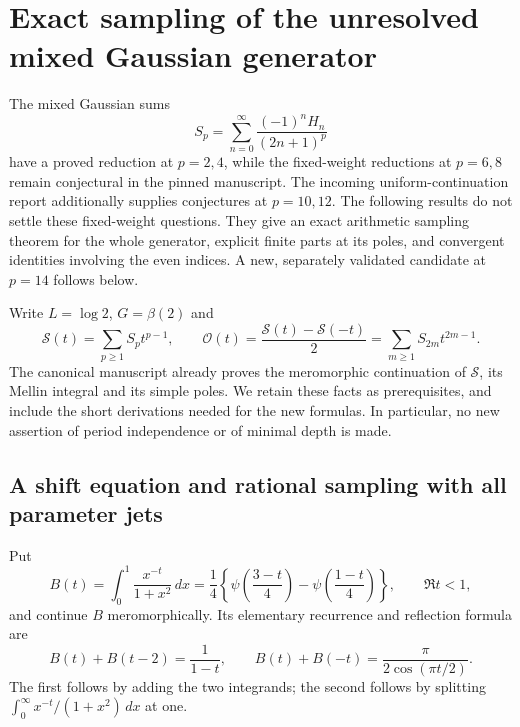 \section{Exact sampling of the unresolved mixed Gaussian generator}
\label{mix:sec}

The mixed Gaussian sums
\[
 S_p=\sum_{n=0}^{\infty}\frac{(-1)^nH_n}{(2n+1)^p}
\]
have a proved reduction at $p=2,4$, while the fixed-weight reductions at
$p=6,8$ remain conjectural in the pinned manuscript.  The incoming
uniform-continuation report additionally supplies conjectures at $p=10,12$.
The following results do not settle these fixed-weight questions. They give
an exact arithmetic sampling theorem for the whole generator, explicit
finite parts at its poles, and convergent identities involving the even
indices. A new, separately validated candidate at $p=14$ follows below.

Write $L=\log2$, $G=\beta(2)$ and
\[
 \mathcal S(t)=\sum_{p\ge1}S_pt^{p-1},\qquad
 \mathcal O(t)=\frac{\mathcal S(t)-\mathcal S(-t)}2
             =\sum_{m\ge1}S_{2m}t^{2m-1}.
\]
The canonical manuscript already proves the meromorphic continuation of
$\mathcal S$, its Mellin integral and its simple poles. We retain these
facts as prerequisites, and include the short derivations needed for the
new formulas. In particular, no new assertion of period independence or
of minimal depth is made.

\subsection{A shift equation and rational sampling with all parameter jets}

Put
\[
 B(t)=\int_0^1\frac{x^{-t}}{1+x^2}\,dx
 =\frac14\left\{\psi\left(\frac{3-t}{4}\right)
                  -\psi\left(\frac{1-t}{4}\right)\right\},
 \qquad \Re t<1,
\]
and continue $B$ meromorphically. Its elementary recurrence and reflection
formula are
\begin{equation}\label{mix:eq:B}
 B(t)+B(t-2)=\frac1{1-t},\qquad
 B(t)+B(-t)=\frac{\pi}{2\cos(\pi t/2)}.
\end{equation}
The first follows by adding the two integrands; the second follows by
splitting $\int_0^\infty x^{-t}/(1+x^2)\,dx$ at one.

